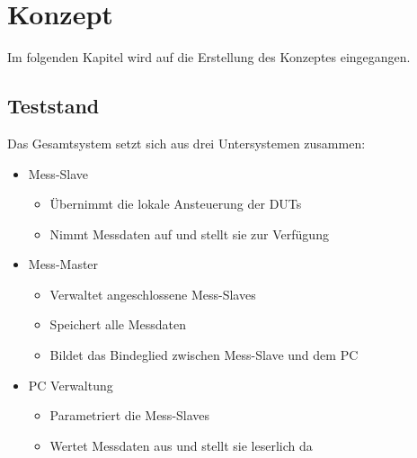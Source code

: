 \chapter{Konzept}
\label{chapter_Konzept}

Im folgenden Kapitel wird auf die Erstellung des Konzeptes eingegangen.

\section{Teststand}
\label{section_Teststand}

Das Gesamtsystem setzt sich aus drei Untersystemen zusammen:

\begin{itemize}

\item Mess-Slave
\begin{itemize}
\item Übernimmt die lokale Ansteuerung der \acp{DUT}
\item Nimmt Messdaten auf und stellt sie zur Verfügung
\end{itemize}

\item Mess-Master
\begin{itemize}
\item Verwaltet angeschlossene Mess-Slaves
\item Speichert alle Messdaten
\item Bildet das Bindeglied zwischen Mess-Slave und dem PC
\end{itemize}

\item PC Verwaltung
\begin{itemize}
\item Parametriert die Mess-Slaves
\item Wertet Messdaten aus und stellt sie leserlich da
\end{itemize}

\end{itemize}


